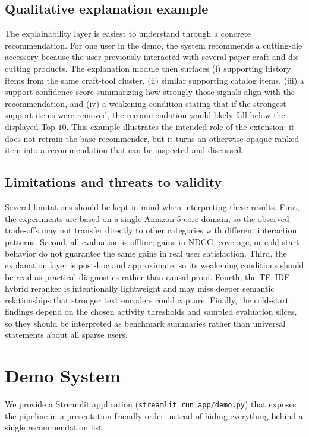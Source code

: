 \documentclass[sigconf,nonacm]{acmart}
\begin{document}
\subsection{Qualitative explanation example}
The explainability layer is easiest to understand through a concrete recommendation. For one user in the demo, the system recommends a cutting-die accessory because the user previously interacted with several paper-craft and die-cutting products. The explanation module then surfaces (i) supporting history items from the same craft-tool cluster, (ii) similar supporting catalog items, (iii) a support confidence score summarizing how strongly those signals align with the recommendation, and (iv) a weakening condition stating that if the strongest support items were removed, the recommendation would likely fall below the displayed Top-$10$. This example illustrates the intended role of the extension: it does not retrain the base recommender, but it turns an otherwise opaque ranked item into a recommendation that can be inspected and discussed.

\subsection{Limitations and threats to validity}
Several limitations should be kept in mind when interpreting these results. First, the experiments are based on a single Amazon 5-core domain, so the observed trade-offs may not transfer directly to other categories with different interaction patterns. Second, all evaluation is offline; gains in NDCG, coverage, or cold-start behavior do not guarantee the same gains in real user satisfaction. Third, the explanation layer is post-hoc and approximate, so its weakening conditions should be read as practical diagnostics rather than causal proof. Fourth, the TF--IDF hybrid reranker is intentionally lightweight and may miss deeper semantic relationships that stronger text encoders could capture. Finally, the cold-start findings depend on the chosen activity thresholds and sampled evaluation slices, so they should be interpreted as benchmark summaries rather than universal statements about all sparse users.

\FloatBarrier

\section{Demo System}
We provide a Streamlit application (\texttt{streamlit run app/demo.py}) that exposes the pipeline in a presentation-friendly order instead of hiding everything behind a single recommendation list.
\end{document}
